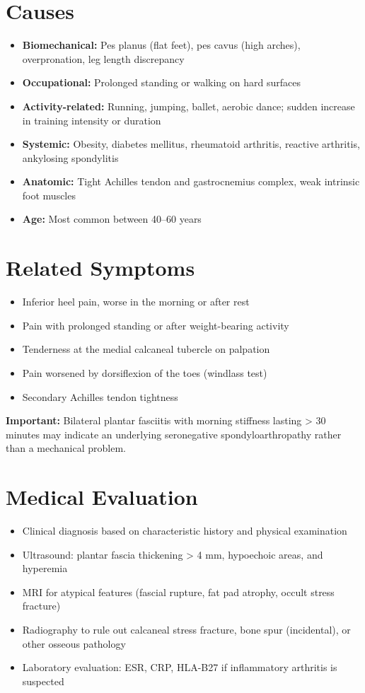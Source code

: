 \section*{Causes}
\begin{itemize}
  \item \textbf{Biomechanical:} Pes planus (flat feet), pes cavus (high arches), overpronation, leg length discrepancy
  \item \textbf{Occupational:} Prolonged standing or walking on hard surfaces
  \item \textbf{Activity-related:} Running, jumping, ballet, aerobic dance; sudden increase in training intensity or duration
  \item \textbf{Systemic:} Obesity, diabetes mellitus, rheumatoid arthritis, reactive arthritis, ankylosing spondylitis
  \item \textbf{Anatomic:} Tight Achilles tendon and gastrocnemius complex, weak intrinsic foot muscles
  \item \textbf{Age:} Most common between 40--60 years
\end{itemize}

\section*{Related Symptoms}
\begin{itemize}
  \item Inferior heel pain, worse in the morning or after rest
  \item Pain with prolonged standing or after weight-bearing activity
  \item Tenderness at the medial calcaneal tubercle on palpation
  \item Pain worsened by dorsiflexion of the toes (windlass test)
  \item Secondary Achilles tendon tightness
\end{itemize}
\textbf{Important:} Bilateral plantar fasciitis with morning stiffness lasting > 30 minutes may indicate an underlying seronegative spondyloarthropathy rather than a mechanical problem.

\section*{Medical Evaluation}
\begin{itemize}
  \item Clinical diagnosis based on characteristic history and physical examination
  \item Ultrasound: plantar fascia thickening > 4 mm, hypoechoic areas, and hyperemia
  \item MRI for atypical features (fascial rupture, fat pad atrophy, occult stress fracture)
  \item Radiography to rule out calcaneal stress fracture, bone spur (incidental), or other osseous pathology
  \item Laboratory evaluation: ESR, CRP, HLA-B27 if inflammatory arthritis is suspected
\end{itemize}

